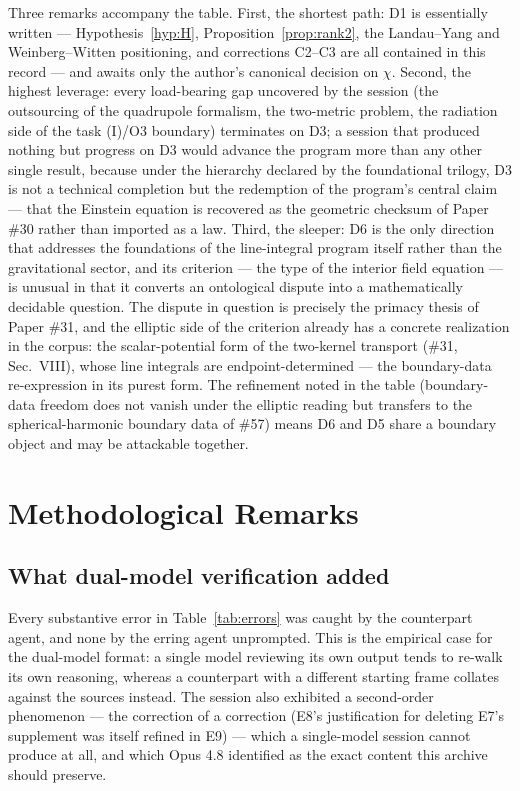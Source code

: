 \documentclass[%
 reprint, amsmath,amssymb, aps, prb, ]{revtex4-2}
\numberwithin{equation}{section}
\begin{document}
Three remarks accompany the table. First, the shortest path: D1 is essentially written --- Hypothesis~\ref{hyp:H}, Proposition~\ref{prop:rank2}, the Landau--Yang and Weinberg--Witten positioning, and corrections C2--C3 are all contained in this record --- and awaits only the author's canonical decision on $\chi$. Second, the highest leverage: every load-bearing gap uncovered by the session (the outsourcing of the quadrupole formalism, the two-metric problem, the radiation side of the task (I)/O3 boundary) terminates on D3; a session that produced nothing but progress on D3 would advance the program more than any other single result, because under the hierarchy declared by the foundational trilogy, D3 is not a technical completion but the redemption of the program's central claim --- that the Einstein equation is recovered as the geometric checksum of Paper \#30 rather than imported as a law. Third, the sleeper: D6 is the only direction that addresses the foundations of the line-integral program itself rather than the gravitational sector, and its criterion --- the type of the interior field equation --- is unusual in that it converts an ontological dispute into a mathematically decidable question. The dispute in question is precisely the primacy thesis of Paper \#31, and the elliptic side of the criterion already has a concrete realization in the corpus: the scalar-potential form of the two-kernel transport (\#31, Sec.~VIII), whose line integrals are endpoint-determined --- the boundary-data re-expression in its purest form. The refinement noted in the table (boundary-data freedom does not vanish under the elliptic reading but transfers to the spherical-harmonic boundary data of \#57) means D6 and D5 share a boundary object and may be attackable together.

\section{Methodological Remarks}
\label{sec:method}

\subsection{What dual-model verification added}

Every substantive error in Table~\ref{tab:errors} was caught by the counterpart agent, and none by the erring agent unprompted. This is the empirical case for the dual-model format: a single model reviewing its own output tends to re-walk its own reasoning, whereas a counterpart with a different starting frame collates against the sources instead. The session also exhibited a second-order phenomenon --- the correction of a correction (E8's justification for deleting E7's supplement was itself refined in E9) --- which a single-model session cannot produce at all, and which Opus 4.8 identified as the exact content this archive should preserve.
\end{document}
